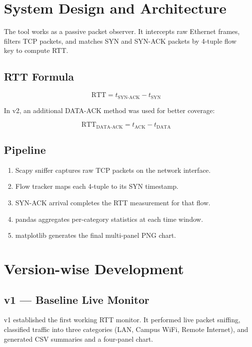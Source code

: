 \documentclass[12pt,a4paper]{article}
\begin{document}
\section{System Design and Architecture}

The tool works as a passive packet observer. It intercepts raw Ethernet frames,
filters TCP packets, and matches SYN and SYN-ACK packets by 4-tuple flow key to
compute RTT.

\subsection{RTT Formula}

\[
\text{RTT} = t_{\text{SYN-ACK}} - t_{\text{SYN}}
\]

In v2, an additional DATA-ACK method was used for better coverage:

\[
\text{RTT}_{\text{DATA-ACK}} = t_{\text{ACK}} - t_{\text{DATA}}
\]

\subsection{Pipeline}

\begin{enumerate}[leftmargin=*]
    \item Scapy sniffer captures raw TCP packets on the network interface.
    \item Flow tracker maps each 4-tuple to its SYN timestamp.
    \item SYN-ACK arrival completes the RTT measurement for that flow.
    \item pandas aggregates per-category statistics at each time window.
    \item matplotlib generates the final multi-panel PNG chart.
\end{enumerate}

\section{Version-wise Development}

\subsection{v1 --- Baseline Live Monitor}

v1 established the first working RTT monitor. It performed live packet sniffing,
classified traffic into three categories (LAN, Campus WiFi, Remote Internet),
and generated CSV summaries and a four-panel chart.
\end{document}
